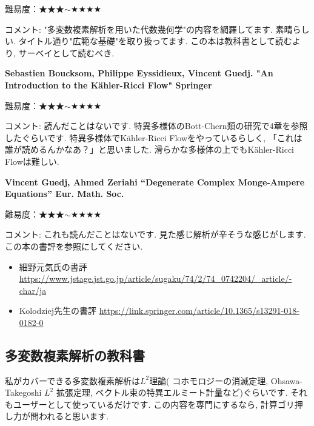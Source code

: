 難易度：★★★$\sim$★★★★ \vspace{-6pt} 

コメント: "多変数複素解析を用いた代数幾何学"の内容を網羅してます. 素晴らしい. タイトル通り"広範な基礎"を取り扱ってます. この本は教科書として読むより, サーベイとして読むべき. 
\vspace{8pt}

\textbf{Sebastien Boucksom, Philippe Eyssidieux, Vincent Guedj. "An Introduction to the Kähler-Ricci Flow" Springer}  \vspace{-6pt} 

難易度：★★★$\sim$★★★★ \vspace{-6pt} 

コメント: 読んだことはないです. 特異多様体のBott-Chern類の研究で4章を参照したぐらいです. 特異多様体でKähler-Ricci Flowをやっているらしく, 「これは誰が読めるんかなあ？」と思いました. 滑らかな多様体の上でもKähler-Ricci Flowは難しい. 

\textbf{Vincent Guedj, Ahmed Zeriahi “Degenerate Complex Monge-Ampere Equations”  Eur. Math. Soc.}
 \vspace{-6pt} 

難易度：★★★$\sim$★★★★ \vspace{-6pt} 

コメント: これも読んだことはないです. 見た感じ解析が辛そうな感じがします. この本の書評を参照にしてください. 
\vspace{-8pt}
\begin{itemize}[left=0pt]
  \setlength{\parskip}{0cm} %
  \setlength{\itemsep}{0cm} %
\item 細野元気氏の書評 \url{https://www.jstage.jst.go.jp/article/sugaku/74/2/74_0742204/_article/-char/ja}
\item Kolodziej先生の書評 \url{https://link.springer.com/article/10.1365/s13291-018-0182-0}
\end{itemize}
\subsection{多変数複素解析の教科書}

私がカバーできる多変数複素解析は$L^2$理論( コホモロジーの消滅定理, Ohsawa-Takegoshi $L^2$ 拡張定理, ベクトル束の特異エルミート計量など)ぐらいです. 
それもユーザーとして使っているだけです. 
この内容を専門にするなら, 計算ゴリ押し力が問われると思います. 

